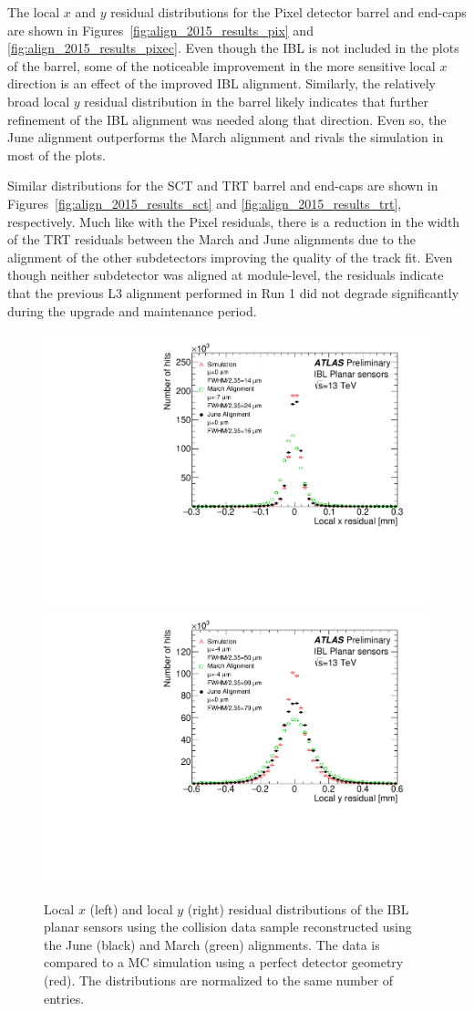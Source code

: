 The local $x$ and $y$ residual distributions for the Pixel detector barrel and end-caps are shown in Figures~\ref{fig:align_2015_results_pix} and \ref{fig:align_2015_results_pixec}.
Even though the IBL is not included in the plots of the barrel, some of the noticeable improvement in the more sensitive local $x$ direction is an effect of the improved IBL alignment.
Similarly, the relatively broad local $y$ residual distribution in the barrel likely indicates that further refinement of the IBL alignment was needed along that direction.
Even so, the June alignment outperforms the March alignment and rivals the simulation in most of the plots.

Similar distributions for the SCT and TRT barrel and end-caps are shown in Figures~\ref{fig:align_2015_results_sct} and \ref{fig:align_2015_results_trt}, respectively.
Much like with the Pixel residuals, there is a reduction in the width of the TRT residuals between the March and June alignments due to the alignment of the other subdetectors improving the quality of the track fit.
Even though neither subdetector was aligned at module-level, the residuals indicate that the previous L3 alignment performed in Run 1 did not degrade significantly during the upgrade and maintenance period.

\begin{figure}[htbp]
  \centering
  \includegraphics[width=.48\textwidth]{figs/alignment/align2015/PIXIBL_Planar_xRES}
  \includegraphics[width=.48\textwidth]{figs/alignment/align2015/PIXIBL_Planar_yRES}
  \caption{Local $x$ (left) and local $y$ (right) residual distributions of the IBL planar sensors using the  collision data sample reconstructed using the June (black) and March (green) alignments.  The data is compared to a MC simulation using a perfect detector geometry (red).  The distributions are normalized to the same number of entries.}
  \label{fig:align_2015_results_ibl}
\end{figure}

